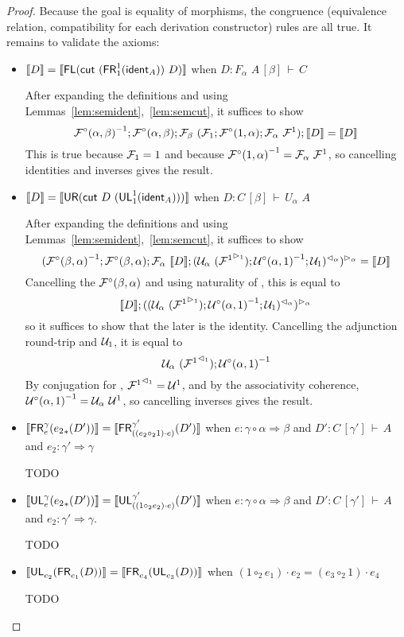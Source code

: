 \documentclass{drl-common/llncs}
\renewcommand{\sem}[1]{\ensuremath{ \llbracket #1 \rrbracket}}
\newcommand{\inv}[1]{\ensuremath{{#1}^{-1}}}
\newcommand{\tc}[2]{\ensuremath{#1 \Rightarrow #2}}
\newcommand\compo[2]{\ensuremath{#1 \circ #2}}
\newcommand\compv[2]{\ensuremath{#1 \cdot #2}}
\newcommand\comph[2]{\ensuremath{#1 \mathbin{\circ_2} #2}}
\newcommand\F[2]{\ensuremath{F_{#1} \,\, #2}}
\newcommand\U[2]{\ensuremath{U_{#1} \,\, #2}}
\newcommand\seq[3]{\ensuremath{#1 \, [ #2 ] \, \vdash \, #3}}
\newcommand\tr[2]{\ensuremath{{{#1}_{*}(#2)}}}
\newcommand\ident[1]{\ensuremath{\dsd{ident}_{#1}}}
\newcommand\cutsym{\ensuremath{\dsd{cut}}}
\newcommand\cut[2]{\ensuremath{{\cutsym \,\, #1 \,\, #2}}}
\newcommand\UL[3]{\ensuremath{\dsd{UL}^{#1}_{#2}(#3)}}
\newcommand\FR[3]{\ensuremath{\dsd{FR}^{#1}_{#2}(#3)}}
\newcommand\FL[1]{\ensuremath{\dsd{FL}(#1)}}
\newcommand\UR[1]{\ensuremath{\dsd{UR}(#1)}}
\begin{document}
\begin{proof}
Because the goal is equality of morphisms, the congruence (equivalence
relation, compatibility for each derivation constructor) rules are all
true.  It remains to validate the axioms:

\begin{itemize}
\item $\sem{D} = \sem{\FL {\cut{(\FR 1 1 {\ident{A}})}{D}} }$
when ${D : \seq{\F \alpha A}{\beta}{C}}$

After expanding the definitions and using
Lemmas~\ref{lem:semident},~\ref{lem:semcut}, it suffices to show
\[
\inv{\semFcomp(\alpha,\beta)};\semFcomp(\alpha,\beta);\semF{\beta}{(\semFo{1};\semFcomp(1,\alpha);\semF{\alpha}{\semFone})};\sem{D}
= \sem{D}
\]
This is true because ${\mathcal{F}_{1}} = 1$ and because
$\inv{\semFcomp(1,\alpha)} = \semF{\alpha}{\semFone}$, so cancelling
identities and inverses gives the result.  

\item $\sem{D} = \sem{\UR {\cut{D}{(\UL 1 1 {\ident{A}})}}}$
when ${D : \seq{C}{\beta}{\U \alpha A}}$

After expanding the definitions and using
Lemmas~\ref{lem:semident},~\ref{lem:semcut}, it suffices to show
\[
\semltor{(\inv{\semFcomp(\beta,\alpha)};\semFcomp(\beta,\alpha);\semF{\alpha}{\sem D};\semrtol{(\semU{\alpha}{(\semltor{\semFone}{1})};\inv{\semUcomp(\alpha,1)};\semUo{1})}{\alpha})}{\alpha}
= \sem{D}
\]
Cancelling the $\mathcal{F}^\circ(\beta,\alpha)$ and using naturality of
\semltor{-}{\alpha}, this is equal to
\[
\sem{D};\semltor{(\semrtol{(\semU{\alpha}{(\semltor{\semFone}{1})};\inv{\semUcomp(\alpha,1)};\semUo{1})}{\alpha})}{\alpha}
\]
so it suffices to show that the later is the identity.  Cancelling the
adjunction round-trip and $\mathcal{U}_{1}$, it is equal to
\[
\semU{\alpha}{(\semrtol{\semFone}{1})};\inv{\semUcomp(\alpha,1)}
\]
By conjugation for \semFone, ${\mathcal{F}^1}^{\vartriangleleft_{1}} = {\mathcal{U}^1}$, and by
the associativity coherence, $\inv{\semUcomp(\alpha,1)} =
\semU{\alpha}{\semUone}$, so cancelling inverses gives the result.  

\item $\sem{{\FR{\gamma}{e}{\tr{e_2}{D'}}}} = \sem{\FR{\gamma'}{(\compv{(\comph{e_2}{1})}{e})}{D'}}$
when $e : \tc{\compo{\gamma}{\alpha}}{\beta}$
and $D' : \seq{C}{\gamma'}{A}$
and $e_2 : \tc{\gamma'}{\gamma}$

TODO

\item $\sem{\UL{\gamma}{e}{\tr{e_2}{D'}}} = \sem{\UL{\gamma'}{(\compv{(\comph{1}{e_2})}{e})}{D'}}$
when $e : \tc{\compo{\gamma}{\alpha}}{\beta}$
and $D' : \seq{C}{\gamma'}{A}$
and $e_2 : \tc{\gamma'}{\gamma}$.

TODO

\item $\sem{\UL {}{e_2} {\FR {} {e_1} {D}}} = \sem{\FR {} {e_4} {\UL {} {e_3} {D}}}$
when ${\compv{(\comph{1}{e_1})}{e_2} = {\compv{(\comph{e_3}{1})}{e_4}}}$

TODO

\end{itemize}
\end{proof}
\end{document}
